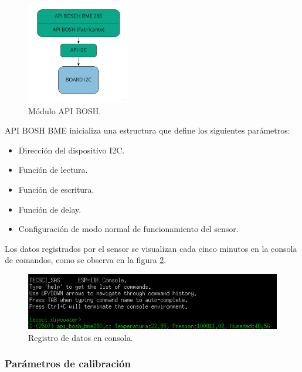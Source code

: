 \begin{figure}[h!]
	\centering
	\includegraphics[width=0.4\textwidth]{./Figures/api_bosh_bme.jpg}
	\caption{Módulo API BOSH.}
	\label{fig:api_bosh}
\end{figure}

API BOSH BME inicializa una estructura que define los siguientes parámetros:
\begin{itemize}
\item Dirección del dispositivo I2C.
\item Función de lectura.
\item Función de escritura.
\item Función de delay.
\item Configuración de modo normal de funcionamiento del sensor. 
\end{itemize}

Los datos registrados por el sensor se visualizan cada cinco minutos en la consola de comandos, como se observa en la figura \ref{fig:api_bosh_consola}.

\begin{figure}[h!]
	\centering
	\includegraphics[width=1\textwidth]{./Figures/registro_bme.png}
	\caption{Registro de datos en consola.}
	\label{fig:api_bosh_consola}
\end{figure}

 

\subsubsection{Parámetros de calibración}
\label{subsec:calibracion_imp}

